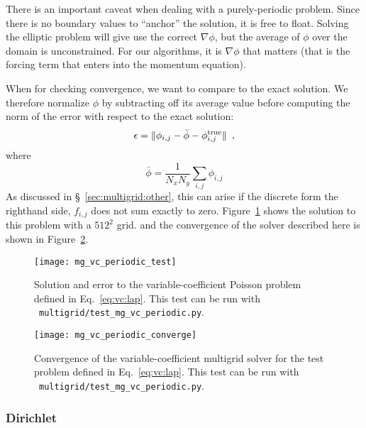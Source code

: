 There is an important caveat when dealing with a purely-periodic
problem.  Since there is no boundary values to ``anchor'' the solution,
it is free to float.  Solving the elliptic problem will give use the
correct $\nabla \phi$, but the average of $\phi$ over the domain is 
unconstrained.  For our algorithms, it is $\nabla \phi$ that matters
(that is the forcing term that enters into the momentum equation).

When for checking convergence, we want to compare to the exact solution.
We therefore normalize $\phi$ by subtracting off its average value before
computing the norm of the error with respect to the exact solution:
\begin{equation}
\epsilon = \| \phi_{i,j} - \bar{\phi} - \phi^\mathrm{true}_{i,j} \| \enskip ,
\end{equation}
where
\begin{equation}
\bar{\phi} = \frac{1}{N_x N_y} \sum_{i,j} \phi_{i,j}
\end{equation}
As discussed in \S~\ref{sec:multigrid:other}, this can arise if
the discrete form the righthand side, $f_{i,j}$ does not sum exactly
to zero.  Figure~\ref{fig:mg_vc} shows the solution to this problem
with a $512^2$ grid. and the convergence of the solver described
here is shown in Figure~\ref{fig:mg_vc_converge}.

\begin{figure}[t]
\centering
\texttt{[image: mg\_vc\_periodic\_test]}
\caption[Solution and error of a variable-coefficient Poisson problem]{\label{fig:mg_vc} Solution and error to the variable-coefficient 
Poisson problem defined in Eq.~\ref{eq:vc:lap}.  This test can be
run with \pyro\ {\tt multigrid/test\_mg\_vc\_periodic.py}.}
\end{figure}

\begin{figure}[t]
\centering
\texttt{[image: mg\_vc\_periodic\_converge]}
\caption[Convergence of the variable-coefficient Poisson solver]{\label{fig:mg_vc_converge} Convergence of the variable-coefficient
multigrid solver for the test problem defined in Eq.~\ref{eq:vc:lap}.  This test can be
run with \pyro\ {\tt multigrid/test\_mg\_vc\_periodic.py}.}
\end{figure}

\subsubsection{Dirichlet}

